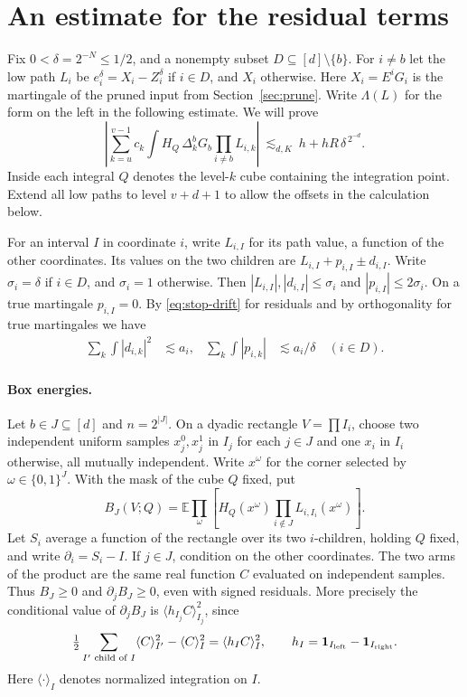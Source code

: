 \documentclass[11pt]{article}
\newcommand{\E}{\mathbb E}
\newcommand{\ind}{\mathbf 1}
\newcommand{\avg}[2]{\langle #1\rangle_{#2}}
\begin{document}
\section{An estimate for the residual terms}\label{sec:residual}
Fix \(0<\delta=2^{-N}\le1/2\), and a nonempty subset
\(D\subseteq[d]\setminus\{b\}\). For \(i\ne b\) let the low path \(L_i\)
be \(e_i^\delta=X_i-Z_i^\delta\) if \(i\in D\), and \(X_i\) otherwise.
Here \(X_i=E^i G_i\) is the martingale of the pruned input from
Section~\ref{sec:prune}. Write \(\Lambda(L)\) for the form on the
left in the following estimate. We will prove
\begin{equation}\label{eq:resbound}
 \left|\sum_{k=u}^{v-1}c_k\int H_Q\,\Delta_k^bG_b
                     \prod_{i\ne b}L_{i,k}\right|
 \ \lesssim_{d,K}\ h+hR\,\delta^{\,2^{-d}} .
\end{equation}
Inside each integral \(Q\) denotes the level-\(k\) cube containing the
integration point. Extend all low paths to level \(v+d+1\) to allow
the offsets in the calculation below.

For an interval \(I\) in coordinate \(i\), write \(L_{i,I}\) for its
path value, a function of the other coordinates. Its values on the two
children are \(L_{i,I}+p_{i,I}\pm d_{i,I}\).
Write \(\sigma_i=\delta\) if \(i\in D\), and \(\sigma_i=1\) otherwise.
Then \(|L_{i,I}|,|d_{i,I}|\le\sigma_i\) and
\(|p_{i,I}|\le2\sigma_i\). On a true martingale \(p_{i,I}=0\).
By \eqref{eq:stop-drift} for residuals and by orthogonality for true
martingales we have
\begin{align}
 \sum_k\int |d_{i,k}|^2&\lesssim a_i, &
 \sum_k\int |p_{i,k}|&\lesssim a_i/\delta\quad(i\in D).\label{eq:dp}
\end{align}

\paragraph{Box energies.}
Let \(b\in J\subseteq[d]\) and \(n=2^{|J|}\). On a dyadic rectangle
\(V=\prod I_i\), choose two independent uniform samples \(x_j^0,x_j^1\)
in \(I_j\) for each \(j\in J\) and one \(x_i\) in \(I_i\) otherwise,
all mutually independent. Write \(x^\omega\) for the corner selected
by \(\omega\in\{0,1\}^J\). With the mask of the cube \(Q\) fixed, put
\[
 B_J(V;Q)=\E\prod_\omega
       \left[ H_Q(x^\omega)\prod_{i\notin J} L_{i,I_i}(x^\omega)\right].
\]
Let \(S_i\) average a function of the rectangle over its two
\(i\)-children, holding \(Q\) fixed, and write \(\partial_i=S_i-I\).
If \(j\in J\), condition on the other coordinates. The two arms of the
product are the same real function \(C\) evaluated on independent
samples. Thus \(B_J\ge0\) and \(\partial_jB_J\ge0\), even with signed
residuals. More precisely the conditional value of \(\partial_j B_J\)
is \(\avg{h_{I_j}C}{I_j}^2\), since
\[
  \tfrac12\sum_{I'\text{ child of }I}\avg C{I'}^2-\avg CI^2
     =\avg{h_I C}{I}^2,\qquad
     h_I=\ind_{I_{\rm left}}-\ind_{I_{\rm right}}.
\]
Here \(\avg{\cdot}{I}\) denotes normalized integration on \(I\).
\end{document}
